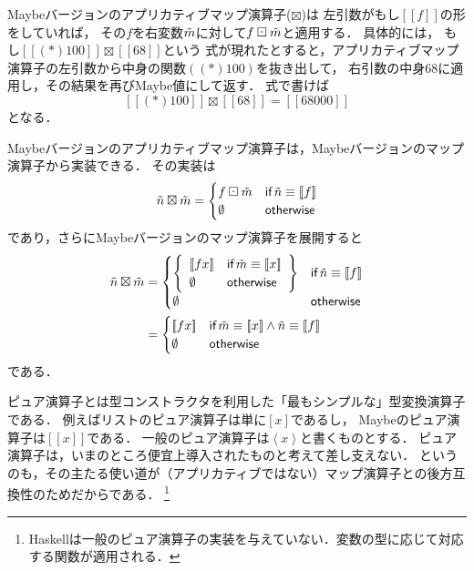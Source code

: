\documentclass[a5paper,draft]{jsbook}
\def\[{\left[\!\left[}
\def\]{\right]\!\right]}
\newcommand{\programminglanguage}[1]{\textsf{#1}}
\newcommand{\haskell}{\programminglanguage{Haskell}}
\newcommand{\mathMaybeVar}[1]{\Tilde{#1}}
\newcommand{\mathMaybeWith}[1]{\[#1\]}
\newcommand{\mathPureWith}[1]{\left\langle#1\right\rangle}
\newcommand{\mathNothing}{\emptyset}
\newcommand{\mathApplicativeMaybeMap}{\mathbin{\boxtimes}}
\newcommand{\mathMaybeMap}{\mathbin{\boxdot}}
\newcommand{\mathKeyword}[1]{\operatorname{\textsf{#1}}}
\newcommand{\mathIf}{\mathKeyword{if}}
\newcommand{\mathOtherwise}{\mathKeyword{otherwise}}
\begin{document}
Maybeバージョンのアプリカティブマップ演算子($\mathApplicativeMaybeMap$)は
左引数がもし$\mathMaybeWith{f}$の形をしていれば，
その$f$を右変数$\mathMaybeVar{m}$に対して$f\mathMaybeMap\mathMaybeVar{m}$と適用する．
具体的には，
もし$\mathMaybeWith{(*)100}\mathApplicativeMaybeMap{}\mathMaybeWith{68}$という
式が現れたとすると，アプリカティブマップ演算子の左引数から中身の関数$((*)100)$を抜き出して，
右引数の中身$68$に適用し，その結果を再びMaybe値にして返す．
式で書けば
$$
\mathMaybeWith{(*)100}\mathApplicativeMaybeMap{}\mathMaybeWith{68}=\mathMaybeWith{68000}
$$
となる．

Maybeバージョンのアプリカティブマップ演算子は，Maybeバージョンのマップ演算子から実装できる．
その実装は
\begin{equation}
\mathMaybeVar{n}\mathApplicativeMaybeMap\mathMaybeVar{m}=\begin{cases}
f\mathMaybeMap\mathMaybeVar{m}&\mathIf\mathMaybeVar{n}\equiv\mathMaybeWith{f}\\
\mathNothing&\mathOtherwise
\end{cases}
\end{equation}
であり，さらにMaybeバージョンのマップ演算子を展開すると
\begin{align*}
\mathMaybeVar{n}\mathApplicativeMaybeMap\mathMaybeVar{m}&=\begin{cases}
\left\{
\begin{array}{ll}
\mathMaybeWith{fx}&\mathIf\mathMaybeVar{m}\equiv\mathMaybeWith{x}\\
\mathNothing&\mathOtherwise
\end{array}\right\}&\mathIf\mathMaybeVar{n}\equiv\mathMaybeWith{f}\\
\mathNothing&\mathOtherwise
\end{cases}\\
&=\begin{cases}
\mathMaybeWith{fx}&\mathIf\mathMaybeVar{m}\equiv\mathMaybeWith{x}\wedge\mathMaybeVar{n}\equiv\mathMaybeWith{f}\\
\mathNothing&\mathOtherwise
\end{cases}
\end{align*}
である．

ピュア演算子とは型コンストラクタを利用した「最もシンプルな」型変換演算子である．
例えばリストのピュア演算子は単に$[x]$であるし，
Maybeのピュア演算子は$\mathMaybeWith{x}$である．
一般のピュア演算子は$\mathPureWith{x}$と書くものとする．
ピュア演算子は，いまのところ便宜上導入されたものと考えて差し支えない．
というのも，その主たる使い道が（アプリカティブではない）マップ演算子との後方互換性のためだからである．%
\footnote{\haskell は一般のピュア演算子の実装を与えていない．変数の型に応じて対応する関数が適用される．}
\end{document}
